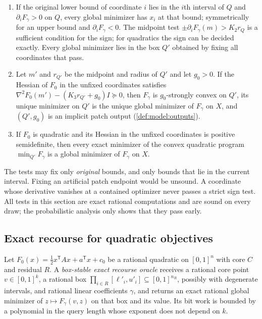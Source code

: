 \begin{lemma}\label{lem:rec:closure}
\leavevmode
\begin{enumerate}[label=(\alph*)]
\item If the original lower bound of coordinate $i$ lies in the $i$th
interval of $Q$ and $\partial_iF_\gamma>0$ on $Q$, every global minimizer has
$x_i$ at that bound; symmetrically for an upper bound and
$\partial_iF_\gamma<0$. The midpoint test $\pm\partial_iF_\gamma(m)>K_2r_Q$
is a sufficient condition for the sign; for quadratics the sign can be
decided exactly. Every global minimizer lies in the box $Q'$ obtained by
fixing all coordinates that pass.
\item Let $m'$ and $r_{Q'}$ be the midpoint and radius of $Q'$ and let
$g_0>0$. If the Hessian of $F_0$ in the unfixed coordinates satisfies
$\nabla^2F_0(m')-(K_3r_{Q'}+g_0)I\succeq0$, then $F_\gamma$ is
$g_0$-strongly convex on $Q'$, its unique minimizer on $Q'$ is the unique
global minimizer of $F_\gamma$ on $X$, and $(Q',g_0)$ is an implicit patch
output (\cref{def:model:outputs}).
\item If $F_0$ is quadratic and its Hessian in the unfixed coordinates is
positive semidefinite, then every exact minimizer of the convex quadratic
program $\min_{Q'}F_\gamma$ is a global minimizer of $F_\gamma$ on $X$.
\end{enumerate}
\end{lemma}

The tests may fix only \emph{original} bounds, and only bounds that lie in
the current interval. Fixing an artificial patch endpoint would be unsound.
A coordinate whose derivative vanishes at a contained optimizer never passes
a strict sign test. All tests in this section are exact rational
computations and are sound on every draw; the probabilistic analysis only
shows that they pass early.

\subsection{Exact recourse for quadratic objectives}\label{sec:rec:qp}

\begin{definition}\label{def:rec:qp-oracle}
Let $F_0(x)=\frac12x^{\mathsf T}Ax+a^{\mathsf T}x+c_0$ be a rational quadratic
on $[0,1]^n$ with core $C$ and residual $R$. A \emph{box-stable exact
recourse oracle} receives a rational core point $v\in[0,1]^k$, a rational
box $\prod_{i\in R}[\ell'_i,u'_i]\subseteq[0,1]^{n_R}$, possibly with
degenerate intervals, and rational linear coefficients $\gamma$, and returns
an exact rational global minimizer of $z\mapsto F_\gamma(v,z)$ on that box and
its value. Its bit work is bounded by a polynomial in the query length whose
exponent does not depend on $k$.
\end{definition}

